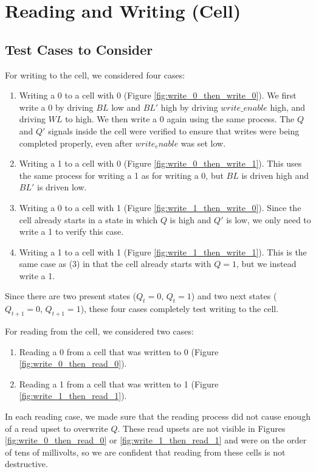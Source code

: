 \documentclass[12pt]{report}
\begin{document}
\section*{Reading and Writing (Cell)}
\subsection*{Test Cases to Consider}
For writing to the cell, we considered four cases:
\begin{enumerate}
\item Writing a 0 to a cell with 0 (Figure \ref{fig:write_0_then_write_0}). We first write a 0 by driving $BL$ low and $BL'$ high by driving $write\_enable$ high, and driving $WL$ to high. We then write a 0 again using the same process. The $Q$ and $Q'$ signals inside the cell were verified to ensure that writes were being completed properly, even after $write_enable$ was set low.
\item Writing a 1 to a cell with 0 (Figure \ref{fig:write_0_then_write_1}). This uses the same process for writing a 1 as for writing a 0, but $BL$ is driven high and $BL'$ is driven low.
\item Writing a 0 to a cell with 1 (Figure \ref{fig:write_1_then_write_0}). Since the cell already starts in a state in which $Q$ is high and $Q'$ is low, we only need to write a 1 to verify this case.
\item Writing a 1 to a cell with 1 (Figure \ref{fig:write_1_then_write_1}). This is the same case as (3) in that the cell already starts with $Q = 1$, but we instead write a 1.
\end{enumerate}

Since there are two present states ($Q_t = 0$, $Q_t = 1$) and two next states ($Q_{t+1} = 0$, $Q_{t+1} = 1$), these four cases completely test writing to the cell.

For reading from the cell, we considered two cases:
\begin{enumerate}
\item Reading a 0 from a cell that was written to 0 (Figure \ref{fig:write_0_then_read_0}).
\item Reading a 1 from a cell that was written to 1 (Figure \ref{fig:write_1_then_read_1}).
\end{enumerate}

In each reading case, we made sure that the reading process did not cause enough of a read upset to overwrite $Q$. These read upsets are not visible in Figures \ref{fig:write_0_then_read_0} or \ref{fig:write_1_then_read_1} and were on the order of tens of millivolts, so we are confident that reading from these cells is not destructive.
\end{document}
